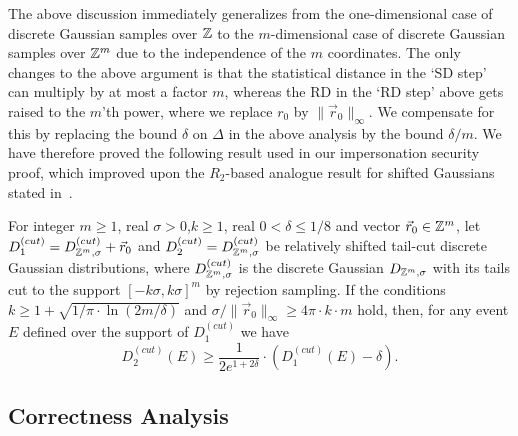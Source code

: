 The above discussion immediately generalizes from the one-dimensional case of
discrete Gaussian samples over $\mathbb{Z}$ to the $m$-dimensional case of discrete
Gaussian samples over $\mathbb{Z}^m$ due to the independence of the $m$
coordinates. The only changes to the above argument is that the statistical
distance in the `SD step' can multiply by at most a factor $m$, whereas the RD
in the `RD step' above gets raised to the $m$'th power, where we replace $r_0$
by $\|\vec{r}_0\|_{\infty}$. We compensate for this by replacing the bound
$\delta$ on $\Delta$ in the above analysis by the bound $\delta/m$. We have
therefore proved the following result used in our impersonation security proof,
which improved upon the $R_2$-based analogue result for shifted Gaussians stated
in~\cite{langlois2014gghlite}.


\begin{lemma} \label{le:Renyi} For integer $m \geq 1$, real
  $\sigma>0$,$k \geq 1$, real $0<\delta \leq 1/8$ and vector
  $\vec{r}_0 \in \mathbb{Z}^m$, let
  $D_1^{(cut)} = D_{\mathbb{Z}^m,\sigma}^{(cut)} + \vec{r}_0$ and
  $D_2^{(cut)} = D_{\mathbb{Z}^m,\sigma}^{(cut)}$ be relatively shifted tail-cut
  discrete Gaussian distributions, where $D_{\mathbb{Z}^m,\sigma}^{(cut)}$ is the
  discrete Gaussian $D_{\mathbb{Z}^m,\sigma}$ with its tails cut to the support
  $[-k\sigma,k\sigma]^m$ by rejection sampling. If the conditions
  $k \geq 1 + \sqrt{1/\pi \cdot \ln(2m/\delta)}$ and
  $\sigma/\|\vec{r}_0\|_{\infty} \geq 4 \pi \cdot k \cdot m$ hold, then, for any
  event $E$ defined over the support of $D_1^{(cut)}$ we have
$$
D_2^{(cut)}(E) \geq \frac{1}{2e^{1+2\delta}} \cdot \left(D_1^{(cut)}(E) - \delta\right).
$$
\end{lemma}

\subsection{Correctness Analysis}
\label{sec:2correctness}

